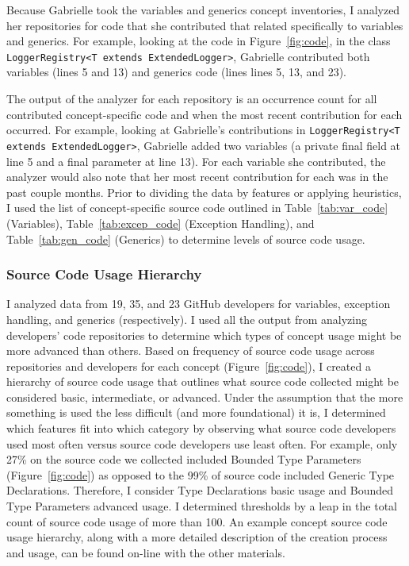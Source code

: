 Because Gabrielle took the variables and generics concept inventories, I analyzed her repositories for code that she contributed that related specifically to variables and generics. For example, looking at the code in Figure~\ref{fig:code}, in the class \texttt{LoggerRegistry<T extends ExtendedLogger>}, Gabrielle contributed both variables (lines 5 and 13) and generics code (lines lines 5, 13, and 23). 

The output of the analyzer for each repository is an occurrence count for all contributed concept-specific code and when the most recent contribution for each occurred.
For example, looking at Gabrielle's contributions in \texttt{LoggerRegistry<T extends ExtendedLogger>}, Gabrielle added two variables (a private final field at line 5 and a final parameter at line 13). For each variable she contributed, the analyzer would also note that her most recent contribution for each was in the past couple months.
Prior to dividing the data by features or applying heuristics, I used the list of concept-specific source code outlined in Table~\ref{tab:var_code} (Variables), Table~\ref{tab:excep_code} (Exception Handling), and Table~\ref{tab:gen_code} (Generics) to determine levels of source code usage.

\subsubsection{Source Code Usage Hierarchy}
I analyzed data from 19, 35, and 23 GitHub developers for variables, exception handling, and generics (respectively).
I used all the output from analyzing developers' code repositories to determine which types of concept usage might be more advanced than others. 
Based on frequency of source code usage across repositories and developers for each concept (Figure~\ref{fig:code}), I created a hierarchy of source code usage that outlines what source code collected might be considered basic, intermediate, or advanced. 
Under the assumption that the more something is used the less difficult (and more foundational) it is, I determined which features fit into which category by observing what source code developers used most often versus source code developers use least often. 
For example, only 27\% on the source code we collected included Bounded Type Parameters (Figure~\ref{fig:code}) as opposed to the 99\% of source code included Generic Type Declarations. Therefore, I consider Type Declarations basic usage and Bounded Type Parameters advanced usage. 
I determined thresholds by a leap in the total count of source code usage of more than 100.	
An example concept source code usage hierarchy, along with a more detailed description of the creation process and usage, can be found on-line with the other materials.


